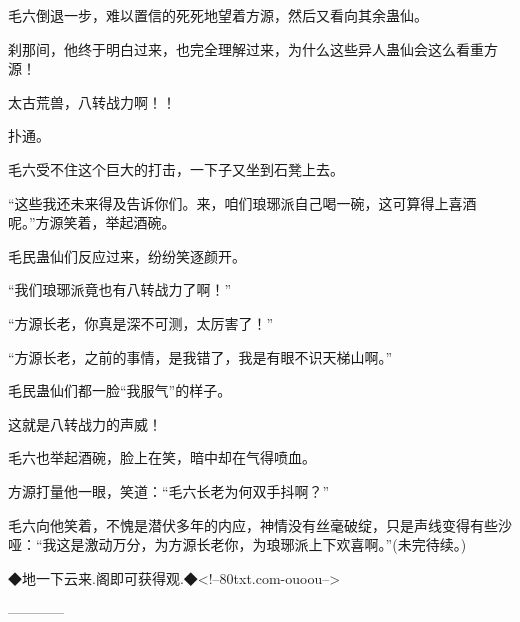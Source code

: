 \begin{this_body}
毛六倒退一步，难以置信的死死地望着方源，然后又看向其余蛊仙。

刹那间，他终于明白过来，也完全理解过来，为什么这些异人蛊仙会这么看重方源！

太古荒兽，八转战力啊！！

扑通。

毛六受不住这个巨大的打击，一下子又坐到石凳上去。

“这些我还未来得及告诉你们。来，咱们琅琊派自己喝一碗，这可算得上喜酒呢。”方源笑着，举起酒碗。

毛民蛊仙们反应过来，纷纷笑逐颜开。

“我们琅琊派竟也有八转战力了啊！”

“方源长老，你真是深不可测，太厉害了！”

“方源长老，之前的事情，是我错了，我是有眼不识天梯山啊。”

毛民蛊仙们都一脸“我服气”的样子。

这就是八转战力的声威！

毛六也举起酒碗，脸上在笑，暗中却在气得喷血。

方源打量他一眼，笑道：“毛六长老为何双手抖啊？”

毛六向他笑着，不愧是潜伏多年的内应，神情没有丝毫破绽，只是声线变得有些沙哑：“我这是激动万分，为方源长老你，为琅琊派上下欢喜啊。”(未完待续。)

◆地一下云来.阁即可获得观.◆<!--80txt.com-ouoou-->

------------

\end{this_body}


